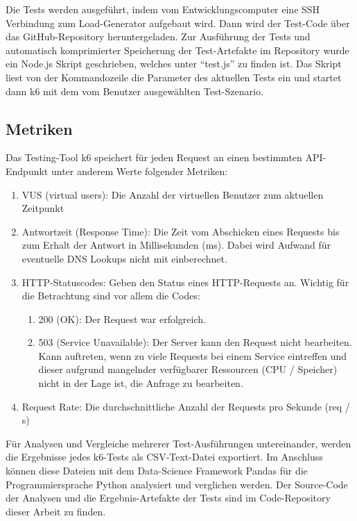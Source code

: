 Die Tests werden ausgeführt, indem vom Entwicklungscomputer eine SSH Verbindung zum Load-Generator aufgebaut wird. Dann wird der Test-Code über das GitHub-Repository heruntergeladen. Zur Ausführung der Tests und automatisch komprimierter Speicherung der Test-Artefakte im Repository wurde ein Node.js Skript geschrieben, welches unter "`test.js"' zu finden ist. Das Skript liest von der Kommandozeile die Parameter des aktuellen Tests ein und startet dann k6 mit dem vom Benutzer ausgewählten Test-Szenario.

\subsection{Metriken}
Das Testing-Tool k6 speichert für jeden Request an einen bestimmten API-Endpunkt unter anderem Werte folgender Metriken:
\begin{enumerate}
    \item VUS (virtual users): Die Anzahl der virtuellen Benutzer zum aktuellen Zeitpunkt 
    
    \item Antwortzeit (Response Time): Die Zeit vom Abschicken eines Requests bis zum Erhalt der Antwort in Millisekunden (ms). Dabei wird Aufwand für eventuelle DNS Lookups nicht mit einberechnet. 
    
    \item HTTP-Statuscodes: Geben den Status eines HTTP-Requests an. Wichtig für die Betrachtung sind vor allem die Codes:
        \begin{enumerate}
            \item 200 (OK): Der Request war erfolgreich.
            \item 503 (Service Unavailable): Der Server kann den Request nicht bearbeiten. Kann auftreten, wenn zu viele Requests bei einem Service eintreffen und dieser aufgrund mangelnder verfügbarer Ressourcen (CPU / Speicher) nicht in der Lage ist, die Anfrage zu bearbeiten.
        \end{enumerate}
        
    \item Request Rate: Die durchschnittliche Anzahl der Requests pro Sekunde (req / s)
\end{enumerate}

Für Analysen und Vergleiche mehrerer Test-Ausführungen untereinander, werden die Ergebnisse jedes k6-Tests als CSV-Text-Datei exportiert. Im Anschluss können diese Dateien mit dem Data-Science Framework Pandas\cite{noauthor_pandas_nodate} für die Programmiersprache Python analysiert und verglichen werden. Der Source-Code der Analysen und die Ergebnis-Artefakte der Tests sind im Code-Repository dieser Arbeit zu finden.

